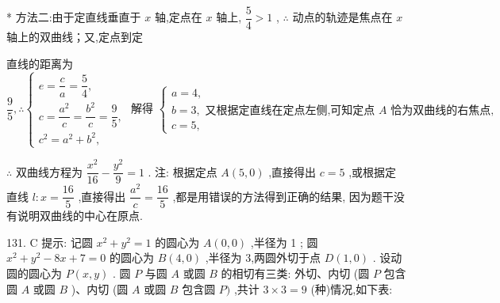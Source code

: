 * 方法二:由于定直线垂直于 $x$ 轴,定点在 $x$ 轴上, $\dfrac{5}{4} > 1$ , $\therefore$ 动点的轨迹是焦点在 $x$ 轴上的双曲线；又,定点到定

直线的距离为 $\dfrac{9}{5},\therefore \left\{  {\begin{array}{l} e = \dfrac{c}{a} = \dfrac{5}{4}, \\  c = \dfrac{{a}^{2}}{c} = \dfrac{{b}^{2}}{c} = \dfrac{9}{5}, \\  {c}^{2} = {a}^{2} + {b}^{2}, \end{array}\text{ 解得 }\left\{  \begin{array}{l} a = 4, \\  b = 3,\text{ 又根据定直线在定点左侧,可知定点 }A\text{ 恰为双曲线的右焦点, } \\  c = 5, \end{array}\right. }\right.$

$\therefore$ 双曲线方程为 $\dfrac{{x}^{2}}{16} - \dfrac{{y}^{2}}{9} = 1$ . 注: 根据定点 $A\left( {5,0}\right)$ ,直接得出 $c = 5$ ,或根据定直线 $l : x = \dfrac{16}{5}$ ,直接得出 $\dfrac{{a}^{2}}{c} = \dfrac{16}{5}$ ,都是用错误的方法得到正确的结果, 因为题干没有说明双曲线的中心在原点.

131. C 提示: 记圆 ${x}^{2} + {y}^{2} = 1$ 的圆心为 $A\left( {0,0}\right)$ ,半径为 1 ; 圆 ${x}^{2} + {y}^{2} - {8x} + 7 = 0$ 的圆心为 $B\left( {4,0}\right)$ ,半径为 3,两圆外切于点 $D\left( {1,0}\right)$ . 设动圆的圆心为 $P\left( {x,y}\right)$ . 圆 $P$ 与圆 $A$ 或圆 $B$ 的相切有三类: 外切、内切 (圆 $P$ 包含圆 $A$ 或圆 $B$ )、内切 (圆 $A$ 或圆 $B$ 包含圆 $P)$ ,共计 $3 \times  3 = 9$ (种)情况,如下表:

\begin{center}
\end{center}


